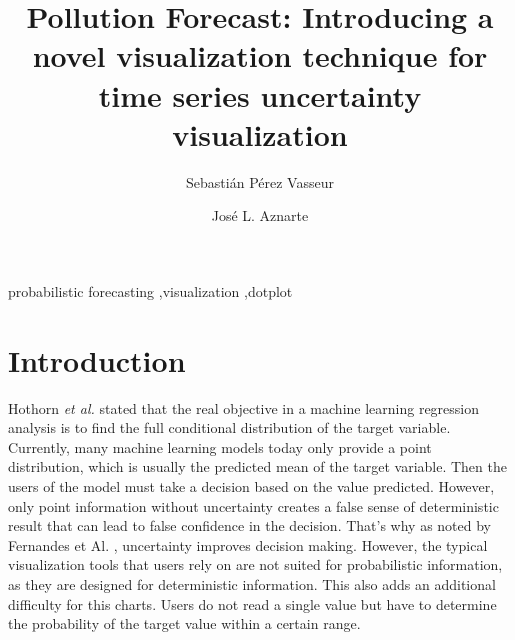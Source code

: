 \documentclass[a4paper,3p,sort&compress]{elsarticle}
\begin{document}
\linenumbers

\newcommand{\no}{NO\textsubscript{2}\xspace}

\begin{frontmatter}

  \title{Pollution Forecast: Introducing a novel visualization technique for time series uncertainty visualization}


  \author{Sebasti\'an P\'erez Vasseur}
  \author{Jos\'e L. Aznarte}
  \address{Artificial Intelligence Department\\Universidad Nacional de
    Educaci\'on a Distancia --- UNED\\c/ Juan del Rosal, 16, Madrid, Spain}
  

\begin{abstract}
  
\end{abstract}

\begin{keyword}
probabilistic forecasting \sep visualization \sep dotplot
\end{keyword}

\end{frontmatter}


\section{Introduction}
\label{sec:intro}

Hothorn \emph{et al.} \cite{hothorn_conditional_2014} stated that the real
objective in a machine learning regression analysis is to find the full conditional distribution
of the target variable. Currently, many machine learning models today only provide a point distribution, 
which is usually the predicted
mean of the target variable. Then the users of the model must take a decision based on the value predicted. 
However, only point information without uncertainty creates a false sense of deterministic result that can lead 
to false confidence in the decision. That's why as noted by Fernandes et Al. \cite{fernandes_uncertainty_2018}, 
uncertainty improves decision making. 
However, the typical visualization tools that users rely on are not suited for probabilistic information, 
as they are designed for deterministic information. This also adds an additional difficulty for this charts. Users do not read
a single value but have to determine the probability of the target value within a certain range.
\end{document}
